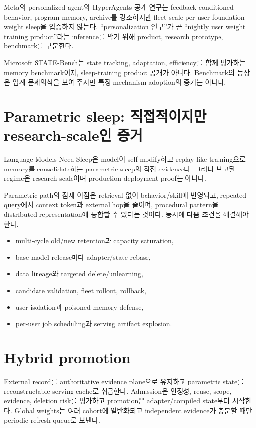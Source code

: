 Meta의 personalized-agent와 HyperAgents 공개 연구는 feedback-conditioned behavior, program memory,
archive를 강조하지만 fleet-scale per-user foundation-weight sleep을 입증하지 않는다.
 \parencite{srcstc0057,srcstc0058} ``personalization 연구''가 곧 ``nightly user weight
training product''라는 inference를 막기 위해 product, research prototype, benchmark를 구분한다.

Microsoft STATE-Bench는 state tracking, adaptation, efficiency를 함께 평가하는 memory benchmark이지,
sleep-training product 공개가 아니다. \parencite{srcstc0056,srcstc0067} Benchmark의
등장은 업계 문제의식을 보여 주지만 특정 mechanism adoption의 증거는 아니다.

\section{Parametric sleep: 직접적이지만 research-scale인 증거}

Language Models Need Sleep은 model이 self-modify하고 replay-like training으로 memory를 consolidate하는
parametric sleep의 직접 evidence다. 그러나 보고된 regime은 research-scale이며 production deployment
proof는 아니다. \parencite{srcstc0021}

Parametric path의 잠재 이점은 retrieval 없이 behavior/skill에 반영되고, repeated query에서 context
token과 external hop을 줄이며, procedural pattern을 distributed representation에 통합할 수 있다는 것이다.
동시에 다음 조건을 해결해야 한다.

\begin{itemize}
  \item multi-cycle old/new retention과 capacity saturation,
  \item base model release마다 adapter/state rebase,
  \item data lineage와 targeted delete/unlearning,
  \item candidate validation, fleet rollout, rollback,
  \item user isolation과 poisoned-memory defense,
  \item per-user job scheduling과 serving artifact explosion.
\end{itemize}

\section{Hybrid promotion}

External record를 authoritative evidence plane으로 유지하고 parametric state를 reconstructable serving
cache로 취급한다. Admission은 안정성, reuse, scope, evidence, deletion risk를 평가하고 promotion은
adapter/compiled state부터 시작한다. Global weights는 여러 cohort에 일반화되고 independent evidence가
충분할 때만 periodic refresh queue로 보낸다.

